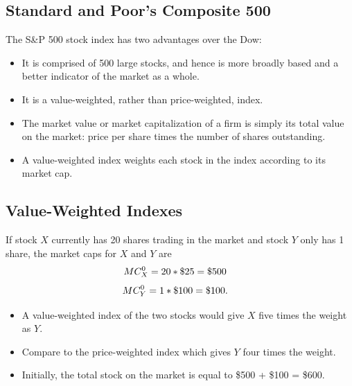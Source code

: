 \documentclass[letterpaper,10pt,english]{sphinxmanual}
\begin{document}
\subsection{Standard and Poor's Composite 500}
\label{indexes:standard-and-poor-s-composite-500}
The S\&P 500 stock index has two advantages over the Dow:
\begin{itemize}
\item {} 
It is comprised of 500 large stocks, and hence is more broadly based
and a better indicator of the market as a whole.

\end{itemize}
\begin{itemize}
\item {} 
It is a value-weighted, rather than price-weighted, index.

\end{itemize}
\begin{itemize}
\item {} 
The market value or market capitalization of a firm is simply its
total value on the market: price per share times the number of
shares outstanding.

\end{itemize}
\begin{itemize}
\item {} 
A value-weighted index weights each stock in the index according to
its market cap.

\end{itemize}


\subsection{Value-Weighted Indexes}
\label{indexes:value-weighted-indexes}
If stock $X$ currently has 20 shares trading in the market and
stock $Y$ only has 1 share, the market caps for $X$ and
$Y$ are
\begin{gather}
\begin{split}MC^0_X & = 20 * \$25 = \$500\end{split}\notag
\end{gather}\begin{gather}
\begin{split}MC^0_Y & = 1*\$100=\$100.\end{split}\notag
\end{gather}\begin{itemize}
\item {} 
A value-weighted index of the two stocks would give $X$ five times
the weight as $Y$.

\end{itemize}
\begin{itemize}
\item {} 
Compare to the price-weighted index which gives $Y$ four times
the weight.

\end{itemize}
\begin{itemize}
\item {} 
Initially, the total stock on the market is equal to \$500 + \$100 =
\$600.

\end{itemize}
\end{document}

